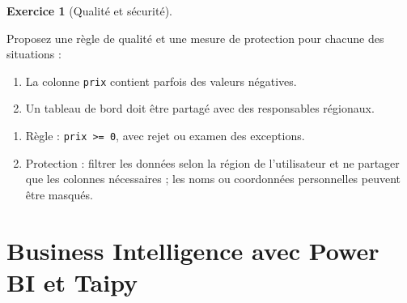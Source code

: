 \documentclass[
  french,
  letterpaper,
  open=any]{scrbook}
\providecommand{\tightlist}{%
  \setlength{\itemsep}{0pt}\setlength{\parskip}{0pt}}
\theoremstyle{definition}
\theoremstyle{definition}
\newtheorem{exercise}{Exercice}[section]
\theoremstyle{remark}
\begin{document}
\begin{exercise}[Qualité et
sécurité]\protect\hypertarget{exr-dwh-8}{}\label{exr-dwh-8}

Proposez une règle de qualité et une mesure de protection pour chacune
des situations :

\begin{enumerate}
\def\labelenumi{\alph{enumi}.}
\tightlist
\item
  La colonne \texttt{prix} contient parfois des valeurs négatives.
\item
  Un tableau de bord doit être partagé avec des responsables régionaux.
\end{enumerate}

\end{exercise}

\begin{tcolorbox}[enhanced jigsaw, arc=.35mm, bottomrule=.15mm, bottomtitle=1mm, breakable, colback=white, colbacktitle=quarto-callout-tip-color!10!white, colframe=quarto-callout-tip-color-frame, coltitle=black, left=2mm, leftrule=.75mm, opacityback=0, opacitybacktitle=0.6, rightrule=.15mm, title=\textcolor{quarto-callout-tip-color}{\faLightbulb}\hspace{0.5em}{Solution de l'exercice Exercice~\ref{exr-dwh-8}}, titlerule=0mm, toprule=.15mm, toptitle=1mm]

\begin{enumerate}
\def\labelenumi{\alph{enumi}.}
\tightlist
\item
  Règle : \texttt{prix\ \textgreater{}=\ 0}, avec rejet ou examen des
  exceptions.
\item
  Protection : filtrer les données selon la région de l'utilisateur et
  ne partager que les colonnes nécessaires ; les noms ou coordonnées
  personnelles peuvent être masqués.
\end{enumerate}

\end{tcolorbox}


\chapter{Business Intelligence avec Power BI et
Taipy}\label{business-intelligence-avec-power-bi-et-taipy}
\end{document}
